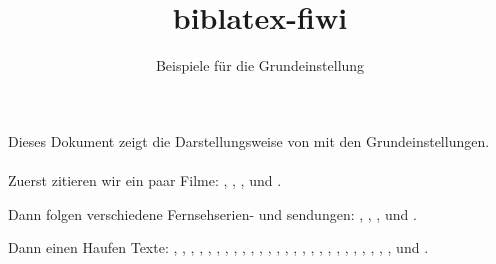 \documentclass[a4paper]{scrartcl}
\begin{document}
\title{biblatex-fiwi}\subtitle{Beispiele für die Grundeinstellung}\date{}\maketitle
\noindent Dieses Dokument zeigt die Darstellungsweise von  mit den Grundeinstellungen.\\ \\

\noindent Zuerst zitieren wir ein paar Filme: , , ,  und .

Dann folgen verschiedene Fernsehserien- und sendungen: , , ,  und .

Dann einen Haufen Texte: \textcite{sklovskij.v:1969a} \textcite{Spiegel.S:2010c}, \textcite{Muller.A:2010a}, \textcite{Wells.H:1908}, \textcite{Spiegel.S:2007b}, \textcite{Lukian.1981}, \textcite{Kepler.J:1993}, \textcite{Coleridge:1983a}, \textcite{vonMatt.P:2002}, \textcite{Keitz.U:2004a}, \textcite{Wells.HG:1980}, \textcite{Ackerman.Strickland:1981}, \textcite{Anderson.P:1971a}, \textcite{Gaudreault.A:1993}, \textcite{Poe.E:1982c}, \textcite{Poe.E:1999a}, \textcite{Parrinder.P:1980}, \textcite{Wells.H:1980*2}, \textcite{James.H:2004a}, \textcite{James.H:2007a}, \textcite{Hedeler.W:2005a}, \textcite{Ballhausen.T:2009a}, \textcite{Zymner.R:2003a}, \textcite{Zymner.R:2011a}, \textcite{Nelmes.J:2011b}, \textcite{Kuhn.A:1990*2,Blish.J:1973a,Dureau.Y:2005a}, \textcite{Todorov.T:1992}, \textcite{Bordwell.D:2004a} und \textcite{Kirchner.A:2008a}.


\printbibliography[nottype=movie]
\printbibliography[type=movie,sorting=title,heading=film]
\end{document}
